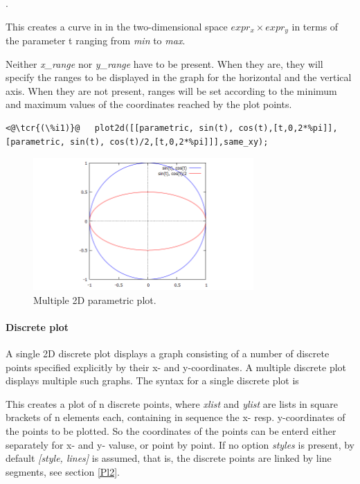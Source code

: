 \documentclass[../Maxima_Workbook.tex]{subfiles}
\begin{document}
\lz {}.

\lz This creates a curve in in the two-dimensional space $ expr_x \times expr_y $ in terms of the parameter t ranging from \emph{min} to \emph{max}. 

\lz Neither \emph{x\_range} nor \emph{y\_range} have to be present. When they are, they will specify the ranges to be displayed in the graph for the horizontal and the vertical axis. When they are not present, ranges will be set according to the minimum and maximum values of the coordinates reached by the plot points.

\lz \begin{lstlisting}
<@\tcr{(\%i1)}@   plot2d([[parametric, sin(t), cos(t),[t,0,2*%pi]],[parametric, sin(t), cos(t)/2,[t,0,2*%pi]]],same_xy);
\end{lstlisting}
\vspace{-2mm} 

\begin{figure}
	\centering
	\includegraphics[width=0.75\textwidth]{Pl_parametric_plot2d.png}
	\caption{Multiple 2D parametric plot.}
	\label{Pl-Fig2}
\end{figure}

\paragraph{Discrete plot} \mbox{}

\lz A single 2D discrete plot displays a graph consisting of a number of discrete points specified explicitly by their x- and y-coordinates. A multiple discrete plot displays multiple such graphs. The syntax for a single discrete plot is

\lz \tcr{\emph{ $ [discrete, xlist, ylist] \, \gbar \, [discrete, [[ x_1,y_1],\dots,[x_n,y_n]]$}}

\lz This creates a plot of n discrete points, where \emph{xlist} and \emph{ylist} are lists in square brackets of n elements each, containing in sequence the x- resp. y-coordinates of the points to be plotted. So the coordinates of the points can be enterd either separately for x- and y- valuse, or point by point. If no option \emph{styles} is present, by default \emph{[style, lines]} is assumed, that is, the discrete points are linked by line segments, see section \ref{Pl2}.
\end{document}
